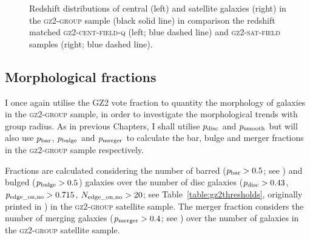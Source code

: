 \begin{figure}
\caption{Redshift distributions of central (left) and satellite galaxies (right) in the \textsc{gz2-group} sample (black solid line) in comparison the redshift matched \textsc{gz2-cent-field-q} (left; blue dashed line) and \textsc{gz2-sat-field} samples (right; blue dashed line).}
\label{fig:zcompare}
\end{figure}

\subsection{Morphological fractions}\label{sec:morphfrac}

I once again utilise the GZ2 vote fraction to quantity the morphology of galaxies in the \textsc{gz2-group} sample, in order to investigate the morphological trends with group radius. As in previous Chapters, I shall utilise $p_{\rm{disc}}$ and $p_{\rm{smooth}}$ but will also use $p_{\rm{bar}}$, $p_{\rm{bulge}}$ and $p_{\rm{merger}}$ to calculate the bar, bulge and merger fractions in the \textsc{gz2-group} sample respectively. 

Fractions are calculated considering the number of barred ($p_{\rm{bar}} > 0.5$; see \citealt{masters11a, cheung13}) and bulged ($p_{\rm{bulge}} > 0.5$) galaxies over the number of disc galaxies ($p_{\rm{disc}} > 0.43$, $p_{\rm{edge\_on, no}} > 0.715$, $N_{\rm{edge\_on, no}} > 20$; see Table~\ref{table:gz2thresholds}, originally printed in \citealt{GZ2}) in the \textsc{gz2-group} satellite sample. The merger fraction considers the number of merging galaxies ($p_{\rm{merger}} > 0.4$; see \citealt{darg10a}) over the number of galaxies in the \textsc{gz2-group} satellite sample. 

